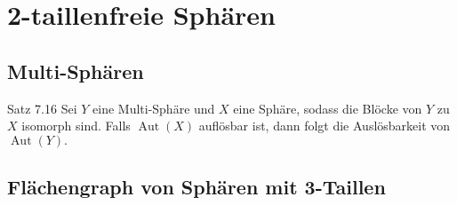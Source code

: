\documentclass{beamer}
\DeclareMathOperator{\Aut}{Aut}
\begin{document}
\section{2-taillenfreie Sphären}
\subsection{Multi-Sphären}
\begin{frame}
\begin{block}{Satz 7.16}
Sei $Y$ eine Multi-Sphäre und $X$ eine Sphäre, sodass die Blöcke von $Y$ zu $X$ isomorph sind. Falls $\Aut(X)$ auflösbar ist, dann folgt die Auslösbarkeit von $\Aut(Y).$ 

\end{block}
\end{frame}
\subsection{Flächengraph von Sphären mit 3-Taillen}
\end{document}
